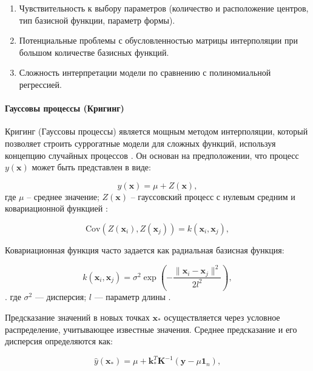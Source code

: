 \begin{enumerate}
    \item Чувствительность к выбору параметров (количество и расположение центров, тип базисной функции, параметр формы).
    \item Потенциальные проблемы с обусловленностью матрицы интерполяции при большом количестве базисных функций.
    \item Сложность интерпретации модели по сравнению с полиномиальной регрессией.
\end{enumerate}

\paragraph{Гауссовы процессы (Кригинг)}\label{sec:ch4/sec2/subsec1/subsubsec3}

Кригинг (Гауссовы процессы) является мощным методом интерполяции,
который позволяет строить суррогатные модели для сложных функций,
используя концепцию случайных процессов \cite{gramacy2020surrogates}. Он основан
на предположении, что процесс \( y(\mathbf{x}) \) может быть представлен в виде:

\begin{equation*}
    y(\mathbf{x}) = \mu + Z(\mathbf{x}),
\end{equation*}
где $\mu$ -- среднее значение; $Z(\mathbf{x})$ -- гауссовский процесс с нулевым средним и
ковариационной функцией \cite{marrel2024probabilistic}:

\begin{equation*}
    \text{Cov}(Z(\mathbf{x}_i), Z(\mathbf{x}_j)) = k(\mathbf{x}_i, \mathbf{x}_j),
\end{equation*}

Ковариационная функция часто задается как радиальная базисная функция:

\begin{equation*}
    k(\mathbf{x}_i, \mathbf{x}_j) = \sigma^2 \exp\left(-\frac{\|\mathbf{x}_i - \mathbf{x}_j\|^2}{2l^2}\right),
\end{equation*}.
где \( \sigma^2 \) — дисперсия;
$l$ — параметр длины \cite{figueroa2021gaussian}.

Предсказание значений в новых точках $\mathbf{x}_*$ осуществляется через условное распределение, учитывающее известные значения.
Среднее предсказание и его дисперсия определяются как:

\begin{equation*}
    \hat{y}(\mathbf{x}_*) = \mu + \mathbf{k}_*^T \mathbf{K}^{-1} (\mathbf{y} - \mu \mathbf{1}_n),
\end{equation*}

